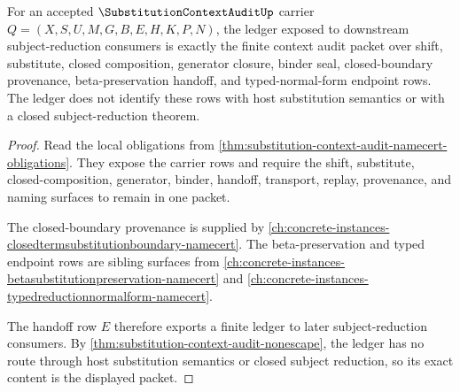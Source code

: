 \begin{theorem}
\label{thm:substitution-context-audit-ledger-exactness}
For an accepted $\SubstitutionContextAuditUp$ carrier $Q=(X,S,U,M,G,B,E,H,K,P,N)$, the ledger exposed to downstream subject-reduction consumers is exactly the finite context audit packet over shift, substitute, closed composition, generator closure, binder seal, closed-boundary provenance, beta-preservation handoff, and typed-normal-form endpoint rows. The ledger does not identify these rows with host substitution semantics or with a closed subject-reduction theorem.
\end{theorem}
\begin{proof}
Read the local obligations from \autoref{thm:substitution-context-audit-namecert-obligations}. They expose the carrier rows and require the shift, substitute, closed-composition, generator, binder, handoff, transport, replay, provenance, and naming surfaces to remain in one packet.

The closed-boundary provenance is supplied by \autoref{ch:concrete-instances-closedtermsubstitutionboundary-namecert}. The beta-preservation and typed endpoint rows are sibling surfaces from \autoref{ch:concrete-instances-betasubstitutionpreservation-namecert} and \autoref{ch:concrete-instances-typedreductionnormalform-namecert}.

The handoff row $E$ therefore exports a finite ledger to later subject-reduction consumers. By \autoref{thm:substitution-context-audit-nonescape}, the ledger has no route through host substitution semantics or closed subject reduction, so its exact content is the displayed packet.
\end{proof}

